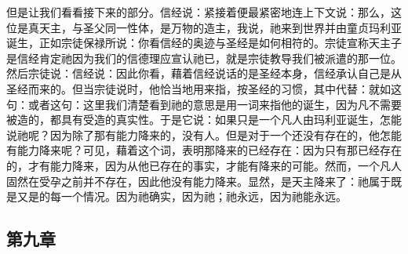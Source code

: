 但是让我们看看接下来的部分。信经说：紧接着便最紧密地连上下文说：那么，这位是真天主，与圣父同一性体，是万物的造主，我说，祂来到世界并由童贞玛利亚诞生，正如宗徒保禄所说：你看信经的奥迹与圣经是如何相符的。宗徒宣称天主子是信经肯定祂因为我们的信德理应宣认祂已，就是宗徒教导我们被派遣的那一位。然后宗徒说：信经说：因此你看，藉着信经说话的是圣经本身，信经承认自己是从圣经而来的。但当宗徒说时，他恰当地用来指，按圣经的习惯，其中代替：就如这句：或者这句：这里我们清楚看到祂的意思是用一词来指他的诞生，因为凡不需要被造的，都具有受造的真实性。于是它说：如果只是一个凡人由玛利亚诞生，怎能说祂呢？因为除了那有能力降来的，没有人。但是对于一个还没有存在的，他怎能有能力降来呢？可见，藉着这个词，表明那降来的已经存在：因为只有那已经存在的，才有能力降来，因为从他已存在的事实，才能有降来的可能。然而，一个凡人固然在受孕之前并不存在，因此他没有能力降来。显然，是天主降来了：祂属于既是又是的每一个情况。因为祂确实，因为祂；祂永远，因为祂能永远。\par


\subsection{第九章}

\par

